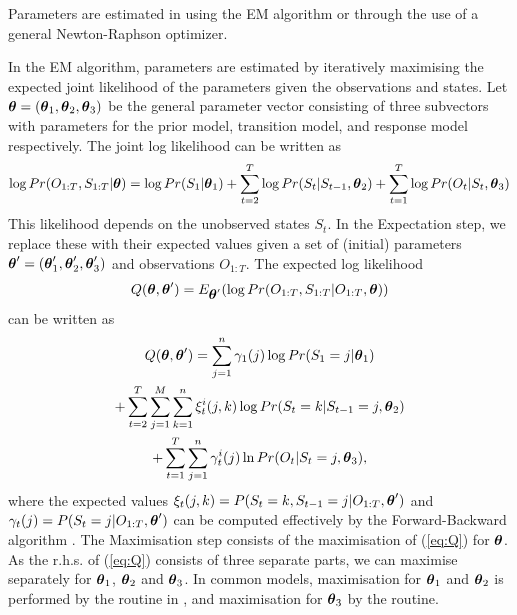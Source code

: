 \documentclass[article]{jss}
\newcommand{\greekv}[1]{\mbox{\boldmath$\mathrm{#1}$}}
\begin{document}
Parameters are estimated in  using the EM algorithm or
through the use of a general Newton-Raphson optimizer.  

In the EM algorithm, parameters are estimated by iteratively maximising the 
expected joint likelihood of the parameters given the observations and states. 
Let $\greekv{\theta} = (\greekv{\theta}_1, \greekv{\theta}_2,\greekv{\theta}_3)$
be the general parameter vector consisting of three subvectors with parameters 
for the prior model, transition model, and response model respectively. The 
joint log likelihood can be written as
\begin{equation}
\log Pr(O_{1:T}, S_{1:T}|\greekv{\theta}) = \log Pr(S_1|\greekv{\theta}_1) 
+ \sum_{t=2}^{T} \log Pr(S_t|S_{t-1},\greekv{\theta}_2) 
+ \sum_{t=1}^{T} \log Pr(O_t|S_t,\greekv{\theta}_3)
\end{equation}
This likelihood depends on the unobserved states $S_t$. In the Expectation step,
we replace these with their expected values given a set of (initial) parameters 
$\greekv{\theta}' = (\greekv{\theta}'_1, \greekv{\theta}'_2,\greekv{\theta}'_3)$
and observations $O_{1:T}$. The expected log likelihood 
\begin{equation}
Q(\greekv{\theta},\greekv{\theta}') = E_{\greekv{\theta}'} 
(\log Pr(O_{1:T},S_{1:T}|O_{1:T},\greekv{\theta}))
\end{equation}
can be written as
\begin{multline}
\label{eq:Q}
Q(\greekv{\theta},\greekv{\theta}') = 
\sum_{j=1}^n \gamma_1(j) \log Pr(S_1=j|\greekv{\theta}_1) \\ 
+ \sum_{t=2}^T \sum_{j=1}^M \sum_{k=1}^n \xi_t^i(j,k) \log Pr(S_t = k|S_{t-1} 
= j,\greekv{\theta}_2) \\ + \sum_{t=1}^T \sum_{j=1}^n \gamma_t^i(j) 
\ln Pr(O_t|S_t=j,\greekv{\theta}_3),
\end{multline}
where the expected values $\xi_t(j,k) =  P(S_t = k, S_{t-1} = j|O_{1:T},\greekv{\theta}')$ and $\gamma_t(j) = P(S_t = j|O_{1:T},\greekv{\theta}')$ can be computed effectively by the Forward-Backward algorithm \citep[see e.g.,][]{Rabiner1989}. The Maximisation step consists of the maximisation of (\ref{eq:Q}) for $\greekv{\theta}$. As the r.h.s. of (\ref{eq:Q}) consists of three separate parts, we can maximise separately for $\greekv{\theta}_1$, $\greekv{\theta}_2$ and $\greekv{\theta}_3$. In common models, maximisation for $\greekv{\theta}_1$ and $\greekv{\theta}_2$ is performed by the  routine in , and maximisation for $\greekv{\theta}_3$ by the  routine. 
\end{document}
